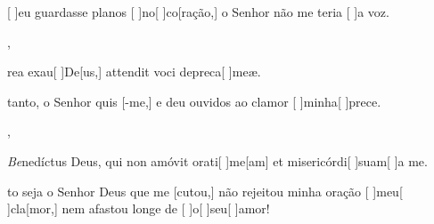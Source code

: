{    {\item {}[ ]{eu} guardasse planos [ ]{no}[ ]{co}[ração,] o Senhor não me teria [ ]{a} voz.~\Antiphona},
  {\item {}rea exau[ ]{De}[us,] attendit voci depreca[ ]{me}æ.~\Antiphona}%
    {\item {}tanto, o Senhor quis [-me,] e deu ouvidos ao clamor [ ]{mi}{nha}[ ]{pre}ce.~\Antiphona},
  {\item {}\textit{Be}{ne}díctus Deus, qui non amóvit orati[ ]{me}[\-am] et misericórdi[ ]{su}{am}[ ]{a} me.~\Antiphona}%
    {\item {}to seja o Senhor Deus que me [cutou,] não rejeitou minha oração [ ]{meu}[ ]{cla}[mor,] nem afastou longe de [ ]{o}[ ]{seu}[ ]{a}mor!~\Antiphona}
}
